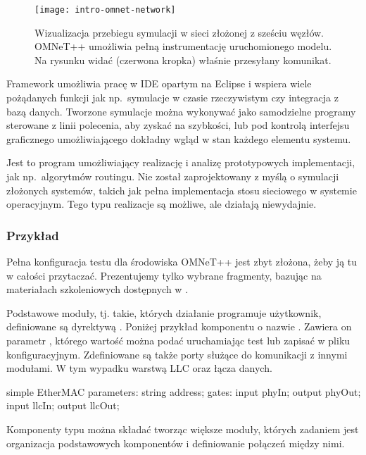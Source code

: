 \documentclass[00-praca-magisterska.tex]{subfiles}
\begin{document}
\begin{figure}
\begin{center}
\leavevmode
\texttt{[image: intro-omnet-network]}
\end{center}
\caption{Wizualizacja przebiegu symulacji w sieci złożonej z sześciu węzłów.
OMNeT++ umożliwia pełną instrumentację uruchomionego modelu. Na rysunku widać
(czerwona kropka) właśnie przesyłany komunikat.}
\label{fig:intro-omnet-network}
\end{figure}

Framework umożliwia pracę w IDE opartym na Eclipse i wspiera wiele pożądanych
funkcji jak np.~symulacje w czasie rzeczywistym czy integracja z bazą danych.
Tworzone symulacje można wykonywać jako samodzielne programy sterowane z linii
polecenia, aby zyskać na szybkości, lub pod kontrolą interfejsu graficznego
umożliwiającego dokładny wgląd w stan każdego elementu systemu.

Jest to program umożliwiający realizację i analizę prototypowych implementacji,
jak np.~algorytmów routingu. Nie został zaprojektowany z myślą o symulacji
złożonych systemów, takich jak pełna implementacja stosu sieciowego w systemie
operacyjnym. Tego typu realizacje są możliwe, ale działają niewydajnie.

\subsubsection{Przykład}

Pełna konfiguracja testu dla środowiska OMNeT++ jest zbyt złożona, żeby ją tu w
całości przytaczać. Prezentujemy tylko wybrane fragmenty, bazując na
materiałach szkoleniowych dostępnych w \cite{omnet-doc}.

Podstawowe moduły, tj. takie, których działanie programuje użytkownik,
definiowane są dyrektywą . Poniżej przykład komponentu o nazwie
. Zawiera on parametr , którego wartość można
podać uruchamiając test lub zapisać w pliku konfiguracyjnym. Zdefiniowane są
także porty służące do komunikacji z innymi modułami. W tym wypadku warstwą LLC
oraz łącza danych.

\begin{textcode}
  simple EtherMAC {
      parameters:
          string address;
      gates:
          input phyIn;
          output phyOut;
          input llcIn;
          output llcOut;
  }
\end{textcode}

Komponenty typu  można składać tworząc większe moduły, których
zadaniem jest organizacja podstawowych komponentów i definiowanie połączeń
między nimi.
\end{document}
